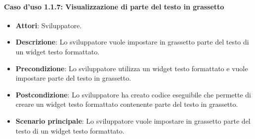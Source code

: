\paragraph{Caso d'uso 1.1.7: Visualizzazione di parte del testo in grassetto}
\begin{itemize}
\item\textbf{Attori}: Sviluppatore.
\item\textbf{Descrizione}: Lo sviluppatore vuole impostare in grassetto parte del testo di un widget testo formattato.
\item\textbf{Precondizione}: Lo sviluppatore utilizza un widget testo formattato e vuole impostare parte del testo in grassetto.
\item\textbf{Postcondizione}: Lo sviluppatore ha creato codice eseguibile che permette di creare un widget testo formattato contenente parte del testo in grassetto.
\item\textbf{Scenario principale}: Lo sviluppatore vuole impostare in grassetto parte del testo di un widget testo formattato.
\end{itemize}